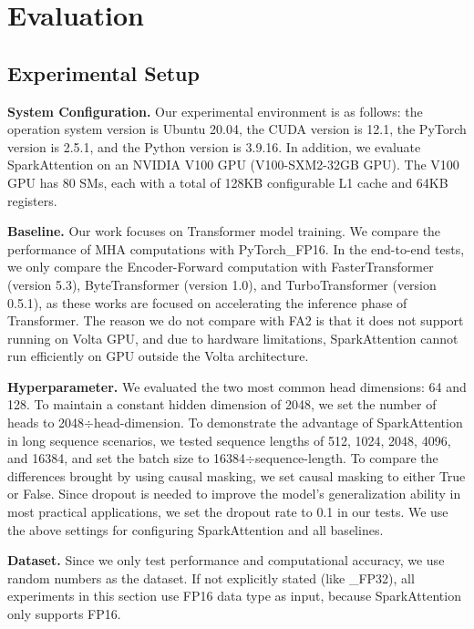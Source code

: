\documentclass[10pt,twocolumn]{article}
\begin{document}
\section{Evaluation}\label{sec5}

\subsection{Experimental Setup} \label{sec:setup}

\textbf{System Configuration.}
Our experimental environment is as follows: the operation system version is Ubuntu 20.04, the CUDA version is 12.1, the PyTorch version is 2.5.1, and the Python version is 3.9.16.
In addition, we evaluate SparkAttention on an NVIDIA V100 GPU (V100-SXM2-32GB GPU). 
The V100 GPU has 80 SMs, each with a total of 128KB configurable L1 cache and 64KB registers.

\noindent\textbf{Baseline.}
Our work focuses on Transformer model training. 
We compare the performance of MHA computations with PyTorch\_FP16. 
In the end-to-end tests, we only compare the Encoder-Forward computation with FasterTransformer (version 5.3), ByteTransformer (version 1.0), and TurboTransformer (version 0.5.1), as these works are focused on accelerating the inference phase of Transformer. 
The reason we do not compare with FA2 is that it does not support running on Volta GPU, and due to hardware limitations, SparkAttention cannot run efficiently on GPU outside the Volta architecture.

\noindent\textbf{Hyperparameter.}
We evaluated the two most common head dimensions: 64 and 128. 
To maintain a constant hidden dimension of 2048, we set the number of heads to 2048$\div$head-dimension. 
To demonstrate the advantage of SparkAttention in long sequence scenarios, we tested sequence lengths of 512, 1024, 2048, 4096, and 16384, and set the batch size to 16384$\div$sequence-length.
To compare the differences brought by using causal masking, we set causal masking to either True or False.
Since dropout is needed to improve the model's generalization ability in most practical applications, we set the dropout rate to 0.1 in our tests. 
We use the above settings for configuring SparkAttention and all baselines.

\noindent\textbf{Dataset.}
Since we only test performance and computational accuracy, we use random numbers as the dataset.
If not explicitly stated (like \_FP32), all experiments in this section use FP16 data type as input, because SparkAttention only supports FP16.
\end{document}
